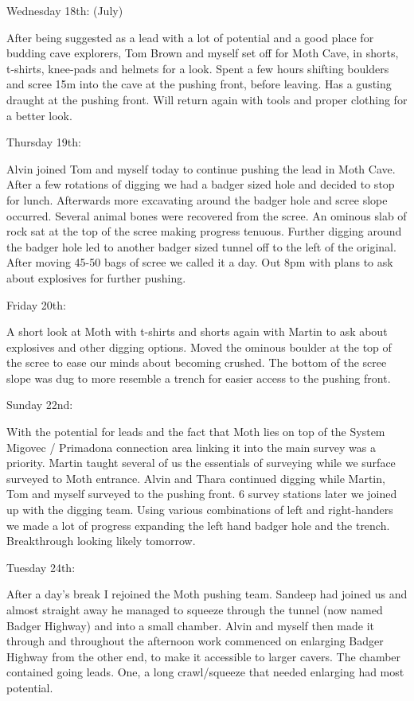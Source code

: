 Wednesday 18th: (July)

After being suggested as a lead with a lot of potential and a good place
for budding cave explorers, Tom Brown and myself set off for Moth Cave,
in shorts, t-shirts, knee-pads and helmets for a look. Spent a few hours
shifting boulders and scree 15m into the cave at the pushing front,
before leaving. Has a gusting draught at the pushing front. Will return
again with tools and proper clothing for a better look.

Thursday 19th:

Alvin joined Tom and myself today to continue pushing the lead in Moth
Cave. After a few rotations of digging we had a badger sized hole and
decided to stop for lunch. Afterwards more excavating around the badger
hole and scree slope occurred. Several animal bones were recovered from
the scree. An ominous slab of rock sat at the top of the scree making
progress tenuous. Further digging around the badger hole led to another
badger sized tunnel off to the left of the original. After moving 45-50
bags of scree we called it a day. Out 8pm with plans to ask about
explosives for further pushing.

Friday 20th:

A short look at Moth with t-shirts and shorts again with Martin to ask
about explosives and other digging options. Moved the ominous boulder at
the top of the scree to ease our minds about becoming crushed. The
bottom of the scree slope was dug to more resemble a trench for easier
access to the pushing front.

Sunday 22nd:

With the potential for leads and the fact that Moth lies on top of the
System Migovec / Primadona connection area linking it into the main
survey was a priority. Martin taught several of us the essentials of
surveying while we surface surveyed to Moth entrance. Alvin and Thara
continued digging while Martin, Tom and myself surveyed to the pushing
front. 6 survey stations later we joined up with the digging team. Using
various combinations of left and right-handers we made a lot of progress
expanding the left hand badger hole and the trench. Breakthrough looking
likely tomorrow.

Tuesday 24th:

After a day's break I rejoined the Moth pushing team. Sandeep had joined
us and almost straight away he managed to squeeze through the tunnel
(now named Badger Highway) and into a small chamber. Alvin and myself
then made it through and throughout the afternoon work commenced on
enlarging Badger Highway from the other end, to make it accessible to
larger cavers. The chamber contained going leads. One, a long
crawl/squeeze that needed enlarging had most potential.


